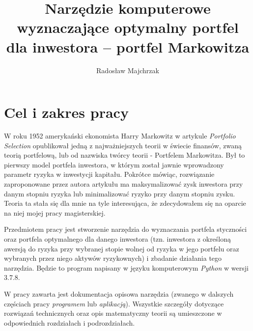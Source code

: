 \documentclass[magister]{dyplom}
\author{Radosław Majchrzak}\album{178640}
\title{Narzędzie komputerowe wyznaczające optymalny portfel dla inwestora – portfel Markowitza}
\date{}
\begin{document}
\maketitle

\tableofcontents


\chapter{Cel i zakres pracy}

W roku 1952 amerykański ekonomista Harry Markowitz w artykule \textit{Portfolio Selection} opublikował jedną z najważniejszych teorii w świecie finansów, zwaną teorią portfelową, lub od nazwiska twórcy teorii - Portfelem Markowitza. Był to pierwszy model portfela inwestora, w którym został jawnie wprowadzony parametr ryzyka w inwestycji kapitału\cite{wikipage}. Pokrótce mówiąc, rozwiązanie zaproponowane przez autora artykułu ma maksymalizować zysk inwestora przy danym stopniu ryzyka lub minimalizować ryzyko przy danym stopniu zysku. Teoria ta stała się dla mnie na tyle interesująca, że zdecydowałem się na oparcie na niej mojej pracy magisterskiej.\\\par
Przedmiotem pracy jest stworzenie narzędzia do wyznaczania portfela styczności oraz portfela optymalnego dla danego inwestora (tzn. inwestora z określoną awersją do ryzyka przy wybranej stopie wolnej od ryzyka w jego portfelu oraz wybranych przez niego aktywów ryzykownych) i zbadanie działania tego narzędzia.
Będzie to program napisany w języku komputerowym \textit{Python} w wersji 3.7.8.\\\par
W pracy zawarta jest dokumentacja opisowa narzędzia (zwanego w dalszych częściach pracy \textit{programem} lub \textit{aplikacją}). Wszystkie szczegóły dotyczące rozwiązań technicznych oraz opis matematyczny teorii są umieszczone w odpowiednich rozdziałach i podrozdziałach.\\\par
\end{document}

